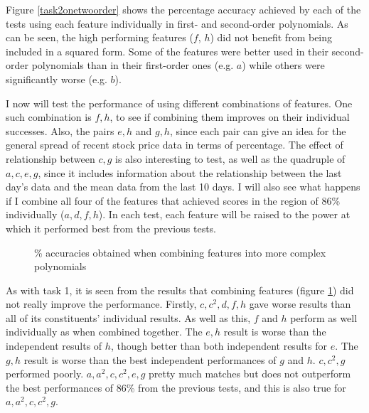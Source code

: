 \documentclass[a4paper,11pt]{article}
\begin{document}
Figure \ref{task2onetwoorder} shows the percentage accuracy achieved by each of the tests using each feature individually in first- and second-order polynomials.  As can be seen, the high performing features ($f$, $h$) did not benefit from being included in a squared form.  Some of the features were better used in their second-order polynomials than in their first-order ones (e.g. $a$) while others were significantly worse (e.g. $b$).

I now will test the performance of using different combinations of features.  One such combination is $f,h$, to see if combining them improves on their individual successes.  Also, the pairs $e,h$ and $g,h$, since each pair can give an idea for the general spread of recent stock price data in terms of percentage.  The effect of relationship between $c,g$ is also interesting to test, as well as the quadruple of $a,c,e,g$, since it includes information about the relationship between the last day's data and the mean data from the last 10 days.  I will also see what happens if I combine all four of the features that achieved scores in the region of 86\%{} individually ($a,d,f,h$).  In each test, each feature will be raised to the power at which it performed best from the previous tests.

\begin{figure}
\centering
\begin{bchart}[step=20,max=100]
		\smallskip
		\smallskip
		\smallskip
		\smallskip
		\smallskip
		\smallskip
\end{bchart}
\caption{\% accuracies obtained when combining features into more complex polynomials}
\label{task2complex}
\end{figure}

As with task 1, it is seen from the results that combining features (figure \ref{task2complex}) did not really improve the performance.  Firstly, $c,c^2,d,f,h$ gave worse results than all of its constituents' individual results.  As well as this, $f$ and $h$ perform as well individually as when combined together.  The $e,h$ result is worse than the independent results of $h$, though better than both independent results for $e$.  The $g,h$ result is worse than the best independent performances of $g$ and $h$.  $c,c^2,g$ performed poorly.  $a,a^2,c,c^2,e,g$ pretty much matches but does not outperform the best performances of 86\%{} from the previous tests, and this is also true for $a,a^2,c,c^2,g$.
\end{document}
